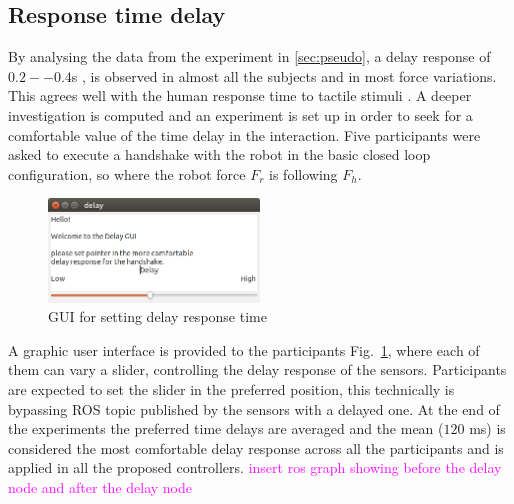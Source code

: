 \subsection{Response time delay}\label{sec:setdelay}
By analysing the data from the experiment in \ref{sec:pseudo}, a delay response of $0.2--0.4$s , is observed in almost all the subjects and in most force variations. This agrees well with the human response time to tactile stimuli \cite{lele1954reaction}. 
A deeper investigation is computed and an experiment is set up in order to seek for a comfortable value of the time delay in the interaction.
Five participants were asked to execute a handshake with the robot in the basic closed loop configuration, so where the robot force $F_{r}$ is following $F_{h}$.
\begin{figure}[h]
  \centering
\includegraphics[width=0.5\textwidth]{Figure/delayGUI.png}
  \caption{GUI for setting delay response time}
  \label{Fig:delayGUI}
\end{figure}
A graphic user interface is provided to the participants Fig.~\ref{Fig:delayGUI}, where each of them can vary a slider, controlling the delay response of the sensors.
Participants are expected to set the slider in the preferred position, this technically is bypassing ROS topic published by the sensors with a delayed one.
At the end of the experiments the preferred time delays are averaged and the mean ($120$ ms) is considered the most comfortable delay response across all the participants and is applied in all the proposed controllers. 
\textcolor{magenta}{insert ros graph showing before the delay node and after the delay node}


